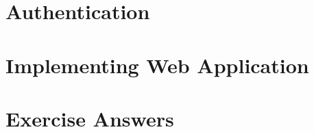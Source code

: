 \documentclass[a4paper,10pt,hidelinks]{book}
\begin{document}
    \chapter{Authentication}\label{ch:authentication}
    \minitoc
    
    

    \chapter{Implementing Web Application}\label{ch:implementing-web-application}
    \minitoc
    
    
    
    

    \appendix

    \chapter{Exercise Answers}\label{ch:exercise-answers}
    \minitoc
    
    
    
    
\end{document}
